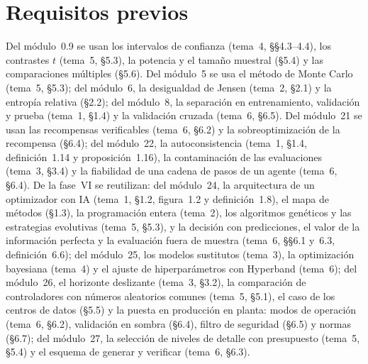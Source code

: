 \documentclass[11pt,a4paper,twoside,openany]{book}
\begin{document}
\section*{Requisitos previos}
Del módulo~0.9 se usan los intervalos de confianza (tema~4, §§4.3--4.4), los contrastes $t$ (tema~5, §5.3), la potencia y el tamaño muestral (§5.4) y las comparaciones múltiples (§5.6). Del módulo~5 se usa el método de Monte Carlo (tema~5, §5.3); del módulo~6, la desigualdad de Jensen (tema~2, §2.1) y la entropía relativa (§2.2); del módulo~8, la separación en entrenamiento, validación y prueba (tema~1, §1.4) y la validación cruzada (tema~6, §6.5). Del módulo~21 se usan las recompensas verificables (tema~6, §6.2) y la sobreoptimización de la recompensa (§6.4); del módulo~22, la autoconsistencia (tema~1, §1.4, definición~1.14 y proposición~1.16), la contaminación de las evaluaciones (tema~3, §3.4) y la fiabilidad de una cadena de pasos de un agente (tema~6, §6.4). De la fase~VI se reutilizan: del módulo~24, la arquitectura de un optimizador con IA (tema~1, §1.2, figura~1.2 y definición~1.8), el mapa de métodos (§1.3), la programación entera (tema~2), los algoritmos genéticos y las estrategias evolutivas (tema~5, §5.3), y la decisión con predicciones, el valor de la información perfecta y la evaluación fuera de muestra (tema~6, §§6.1 y~6.3, definición~6.6); del módulo~25, los modelos sustitutos (tema~3), la optimización bayesiana (tema~4) y el ajuste de hiperparámetros con Hyperband (tema~6); del módulo~26, el horizonte deslizante (tema~3, §3.2), la comparación de controladores con números aleatorios comunes (tema~5, §5.1), el caso de los centros de datos (§5.5) y la puesta en producción en planta: modos de operación (tema~6, §6.2), validación en sombra (§6.4), filtro de seguridad (§6.5) y normas (§6.7); del módulo~27, la selección de niveles de detalle con presupuesto (tema~5, §5.4) y el esquema de generar y verificar (tema~6, §6.3).
\end{document}
